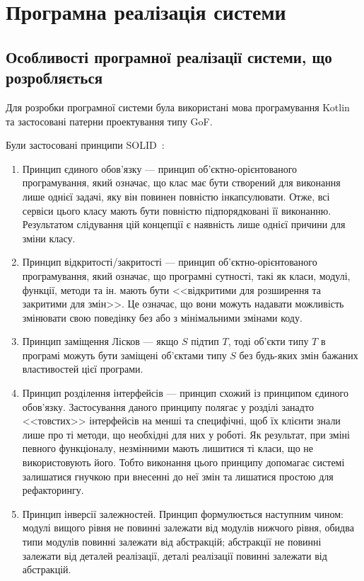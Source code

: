 \section{Програмна реалізація системи}
\subsection{Особливості програмної реалізації системи, що розробляється}
Для розробки програмної системи була використані мова програмування Kotlin та застосовані патерни проектування типу GoF.

Були застосовані принципи SOLID~\cite{Arch2007}:
\begin{enumerate}
	\item Принцип єдиного обов'язку --- принцип об'єктно-орієнтованого програмування, який означає, що клас має бути створений для виконання лише однієї задачі, яку він повинен повністю інкапсулювати.
	      Отже, всі сервіси цього класу мають бути повністю підпорядковані її виконанню.
	      Результатом слідування цій концепції є наявність лише однієї причини для зміни класу.
	\item Принцип відкритості/закритості --- принцип об'єктно-орієнтованого програмування, який означає, що програмні сутності, такі як класи, модулі, функції, методи та ін. мають бути <<відкритими для розширення та закритими для змін>>.
	      Це означає, що вони можуть надавати можливість змінювати свою поведінку без або з мінімальними змінами коду.
	\item Принцип заміщення Лісков --- якщо $S$ підтип $T$, тоді об'єкти типу $T$ в програмі можуть бути заміщені об'єктами типу $S$ без будь-яких змін бажаних властивостей цієї програми.
	\item Принцип розділення інтерфейсів --- принцип схожий із принципом єдиного обов'язку.
	      Застосування даного принципу полягає у розділі занадто <<товстих>> інтерфейсів на менші та специфічні, щоб їх клієнти знали лише про ті методи, що необхідні для них у роботі.
	      Як результат, при зміні певного функціоналу, незмінними мають лишитися ті класи, що не використовують його.
	      Тобто виконання цього принципу допомагає системі залишатися гнучкою при внесенні до неї змін та лишатися простою для рефакторингу.
	\item Принцип інверсії залежностей.
	      Принцип формулюється наступним чином: модулі вищого рівня не повинні залежати від модулів нижчого рівня, обидва типи модулів повинні залежати від абстракцій; абстракції не повинні залежати від деталей реалізації, деталі реалізації повинні залежати від абстракцій.
\end{enumerate}

